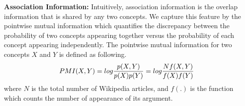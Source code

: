 
{\bf Association Information:} Intuitively, association information is
the overlap information that is shared by any two concepts. We capture
this feature by the pointwise mutual information which quantifies the
discrepancy between the probability of two concepts appearing together
versus the probability of each concept appearing independently. The
pointwise mutual information for two concepts $X$ and $Y$ is defined
as following.
%
\begin{equation}
  \label{eq:2}
  PMI(X, Y) = log \frac{p(X, Y)}{p(X)p(Y)} = log\frac{N f(X,Y)}{f(X)f(Y)} \notag
\end{equation}
%
where $N$ is the total number of Wikipedia articles, and $f(.)$ is the
function which counts the number of appearance of its argument.




